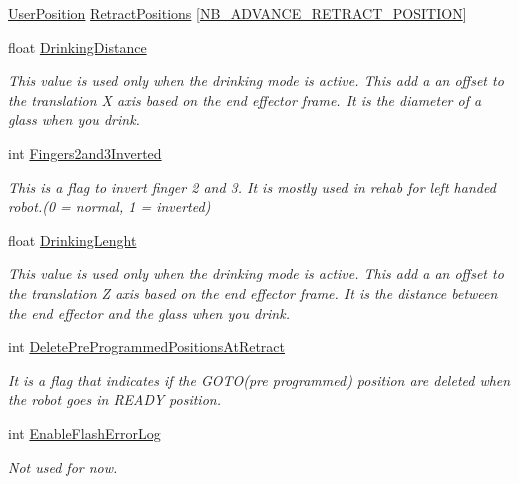 \begin{DoxyCompactItemize}
\hyperlink{struct_user_position}{User\+Position} \hyperlink{struct_client_configurations_aaebc19d45af665f9db9322d74021ec22}{Retract\+Positions} \mbox{[}\hyperlink{_kinova_types_8h_a663862aeb115e7f11080df128498e924}{N\+B\+\_\+\+A\+D\+V\+A\+N\+C\+E\+\_\+\+R\+E\+T\+R\+A\+C\+T\+\_\+\+P\+O\+S\+I\+T\+I\+ON}\mbox{]}
\item 
float \hyperlink{struct_client_configurations_a494c5a866ae44191aafdc66ab69033c3}{Drinking\+Distance}
\begin{DoxyCompactList}\small\item\em This value is used only when the drinking mode is active. This add a an offset to the translation X axis based on the end effector frame. It is the diameter of a glass when you drink. \end{DoxyCompactList}\item 
int \hyperlink{struct_client_configurations_a55cb748c864cd65d8136da316b46df61}{Fingers2and3\+Inverted}
\begin{DoxyCompactList}\small\item\em This is a flag to invert finger 2 and 3. It is mostly used in rehab for left handed robot.(0 = normal, 1 = inverted) \end{DoxyCompactList}\item 
float \hyperlink{struct_client_configurations_a1029013b8d5d2d9ea902ab628c98a7e0}{Drinking\+Lenght}
\begin{DoxyCompactList}\small\item\em This value is used only when the drinking mode is active. This add a an offset to the translation Z axis based on the end effector frame. It is the distance between the end effector and the glass when you drink. \end{DoxyCompactList}\item 
int \hyperlink{struct_client_configurations_ab0dca6d6259625fafd1c725533337460}{Delete\+Pre\+Programmed\+Positions\+At\+Retract}
\begin{DoxyCompactList}\small\item\em It is a flag that indicates if the G\+O\+T\+O(pre programmed) position are deleted when the robot goes in R\+E\+A\+DY position. \end{DoxyCompactList}\item 
int \hyperlink{struct_client_configurations_a16b087061d560a4f185e779352d6e2e3}{Enable\+Flash\+Error\+Log}
\begin{DoxyCompactList}\small\item\em Not used for now. \end{DoxyCompactList}\item 

\end{DoxyCompactItemize}
